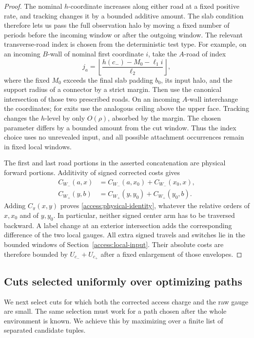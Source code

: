 \begin{proof}
The nominal $h$-coordinate increases along either road at a fixed
positive rate, and tracking changes it by a bounded additive amount.
The slab condition therefore lets us pass the full observation halo by
moving a fixed number of periods before the incoming window or after
the outgoing window.  The relevant transverse-road index is chosen from
the deterministic test type.
For example, on an incoming $B$-wall of nominal first coordinate $i$,
take the $A$-road of index
\[
 j_a=\left\lfloor
       \frac{h(c_-)-M_0-\ell_1i}{\ell_2}\right\rfloor,
\]
where the fixed $M_0$ exceeds the final slab padding $b_0$, its input halo,
and the support radius of a connector by a strict margin.  Then use the
canonical intersection of those two prescribed roads.  On an incoming
$A$-wall interchange the coordinates; for exits use the analogous ceiling
above the upper face.  Tracking changes the $h$-level by only $O(\rho)$,
absorbed by the margin.  The chosen parameter differs by a bounded amount
from the cut window.  Thus the index choice uses no unrevealed input,
and all possible attachment occurrences remain in fixed local windows.

The first and last road portions in the asserted concatenation are
physical forward portions.  Additivity of signed corrected costs gives
\[
 \begin{aligned}
 C_{W_-}(a,x)&=C_{W_-}(a,x_0)+C_{W_-}(x_0,x),\\
 C_{W_+}(y,b)&=C_{W_+}(y,y_0)+C_{W_+}(y_0,b).
 \end{aligned}
\]
Adding $C_\pi(x,y)$ proves \eqref{access:physical-identity}, whatever the
relative orders of $x,x_0$ and of $y,y_0$.  In particular, neither signed
center arm has to be traversed backward.  A label change at an exterior
intersection adds the corresponding difference of the two local gauges.
All extra signed travels and switches lie in the bounded windows of
Section~\ref{access:local-input}.  Their absolute costs are therefore
bounded by $U_{c_-}+U_{c_+}$ after a fixed enlargement of those envelopes.
\end{proof}

\subsection{Cuts selected uniformly over optimizing paths}

We next select cuts for which both the corrected access charge and the
raw gauge are small.  The same selection must work for a path chosen
after the whole environment is known.  We achieve this by maximizing
over a finite list of separated candidate tuples.

